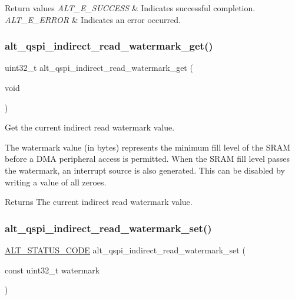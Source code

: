 \begin{DoxyRetVals}{Return values}
{\em A\+L\+T\+\_\+\+E\+\_\+\+S\+U\+C\+C\+E\+SS} & Indicates successful completion. \\
\hline
{\em A\+L\+T\+\_\+\+E\+\_\+\+E\+R\+R\+OR} & Indicates an error occurred. \\
\hline
\end{DoxyRetVals}
\mbox{\label{group__ALT__QSPI__INDAC_ga5c90fccba9d6aecc4a0f76f23a1d7910}} 
\subsubsection{\texorpdfstring{alt\_qspi\_indirect\_read\_watermark\_get()}{alt\_qspi\_indirect\_read\_watermark\_get()}}
{\footnotesize\ttfamily uint32\+\_\+t alt\+\_\+qspi\+\_\+indirect\+\_\+read\+\_\+watermark\+\_\+get (\begin{DoxyParamCaption}\item[{void}]{ }\end{DoxyParamCaption})}

Get the current indirect read watermark value.

The watermark value (in bytes) represents the minimum fill level of the S\+R\+AM before a D\+MA peripheral access is permitted. When the S\+R\+AM fill level passes the watermark, an interrupt source is also generated. This can be disabled by writing a value of all zeroes.

\begin{DoxyReturn}{Returns}
The current indirect read watermark value. 
\end{DoxyReturn}
\mbox{\label{group__ALT__QSPI__INDAC_gaad236d0859ac6a3eac9875be365b74c6}} 
\subsubsection{\texorpdfstring{alt\_qspi\_indirect\_read\_watermark\_set()}{alt\_qspi\_indirect\_read\_watermark\_set()}}
{\footnotesize\ttfamily \mbox{\hyperlink{hwlib_8h_abdb0d369f069723ca55d6c94bcaaaa12}{A\+L\+T\+\_\+\+S\+T\+A\+T\+U\+S\+\_\+\+C\+O\+DE}} alt\+\_\+qspi\+\_\+indirect\+\_\+read\+\_\+watermark\+\_\+set (\begin{DoxyParamCaption}\item[{const uint32\+\_\+t}]{watermark }\end{DoxyParamCaption})}

